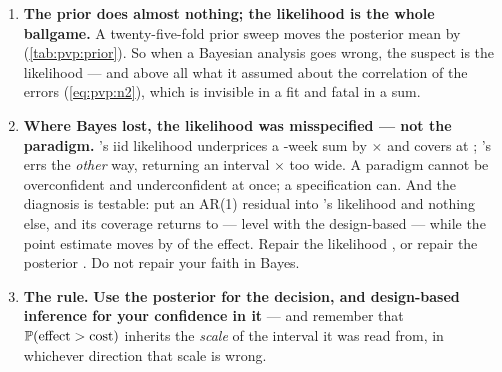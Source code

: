 \begin{enumerate}[leftmargin=*, itemsep=.45em]
  \item \textbf{The prior does almost nothing; the likelihood is the whole ballgame.} A
        twenty-five-fold prior sweep moves the posterior mean by \eur{\nbZeroPriorShift}
        (\cref{tab:pvp:prior}). So when a Bayesian analysis goes wrong, the suspect is the
        likelihood --- and above all what it assumed about the correlation of the errors
        (\cref{eq:pvp:n2}), which is invisible in a fit and fatal in a sum.

  \item \textbf{Where Bayes lost, the likelihood was misspecified --- not the paradigm.} 's
        iid likelihood underprices a \nbSevenNPost-week sum by \nbSevenUnderprice$\times$ and covers
        at \pc{\nbSevenTotalCov}; 's errs the \emph{other} way, returning an interval
        \nbEightBayesOverCluster$\times$ too wide. A paradigm
        cannot be overconfident and underconfident at once; a specification can. And the diagnosis
        is testable: put an AR(1) residual into 's likelihood and nothing else, and its
        coverage returns to \pc{\nbSevenTotalCovArone} --- level with the design-based
        \pc{\nbSevenRiCov} --- while the point estimate moves by \pc{\nbSevenEstDiffPct} of the
        effect. Repair the likelihood \citep{brodersen2015}, or repair the posterior
        \citep{mueller2013}. Do not repair your faith in Bayes.

  \item \textbf{The rule.} \textbf{Use the posterior for the decision, and design-based inference
        for your confidence in it} --- and remember that $\operatorname{\mathbb{P}}(\text{effect} > \text{cost})$
        inherits the \emph{scale} of the interval it was read from, in whichever direction that
        scale is wrong.
\end{enumerate}

